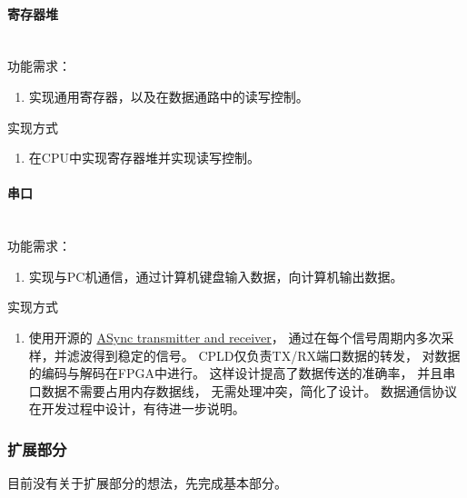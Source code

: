             \paragraph{寄存器堆}
                \mbox{} \\ 

                功能需求：
                \begin{enumerate}
                \item
                实现通用寄存器，以及在数据通路中的读写控制。
                \end{enumerate}

                实现方式
                \begin{enumerate}
                \item
                在CPU中实现寄存器堆并实现读写控制。
                \end{enumerate}

            \paragraph{串口}
                \mbox{} \\

                功能需求：
                \begin{enumerate}
                \item
                实现与PC机通信，通过计算机键盘输入数据，向计算机输出数据。
                \end{enumerate}

                实现方式
                \begin{enumerate}
                \item
                使用开源的%
                \href{http://www.fpga4fun.com/SerialInterface.html}{ASync transmitter and receiver}，%
                通过在每个信号周期内多次采样，并滤波得到稳定的信号。%
                CPLD仅负责TX/RX端口数据的转发，%
                对数据的编码与解码在FPGA中进行。%
                这样设计提高了数据传送的准确率，%
                并且串口数据不需要占用内存数据线，%
                无需处理冲突，简化了设计。%
                数据通信协议在开发过程中设计，有待进一步说明。

                \end{enumerate}
        \subsubsection{扩展部分}
            目前没有关于扩展部分的想法，先完成基本部分。

